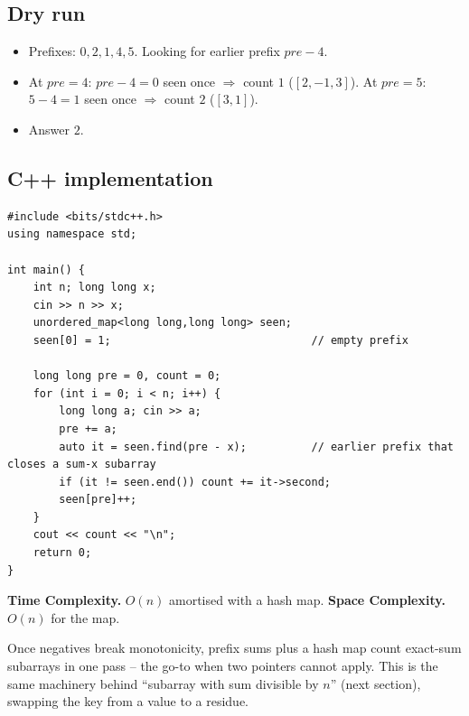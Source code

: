\subsection*{Dry run}


\begin{itemize}
  \item Prefixes: $0,2,1,4,5$. Looking for earlier prefix
        $\textit{pre}-4$.
  \item At $\textit{pre}=4$: $\textit{pre}-4=0$ seen once $\Rightarrow$
        count $1$ ($[2,-1,3]$). At $\textit{pre}=5$: $5-4=1$ seen once
        $\Rightarrow$ count $2$ ($[3,1]$).
  \item Answer $2$.
\end{itemize}

\subsection*{C++ implementation}

\begin{lstlisting}
#include <bits/stdc++.h>
using namespace std;

int main() {
    int n; long long x;
    cin >> n >> x;
    unordered_map<long long,long long> seen;
    seen[0] = 1;                               // empty prefix

    long long pre = 0, count = 0;
    for (int i = 0; i < n; i++) {
        long long a; cin >> a;
        pre += a;
        auto it = seen.find(pre - x);          // earlier prefix that closes a sum-x subarray
        if (it != seen.end()) count += it->second;
        seen[pre]++;
    }
    cout << count << "\n";
    return 0;
}
\end{lstlisting}

\begin{complexitybox}
\textbf{Time Complexity.} $O(n)$ amortised with a hash map. \textbf{Space
Complexity.} $O(n)$ for the map.
\end{complexitybox}

\begin{takeawaybox}
Once negatives break monotonicity, prefix sums plus a hash map count
exact-sum subarrays in one pass -- the go-to when two pointers cannot apply.
This is the same machinery behind ``subarray with sum divisible by $n$''
(next section), swapping the key from a value to a residue.
\end{takeawaybox}
